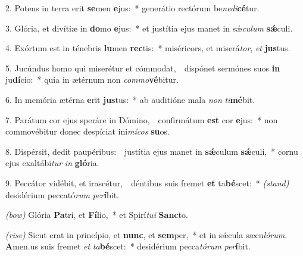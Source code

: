 2. Potens in terra erit \textbf{se}men \textbf{e}jus:~* generátio rectórum be\textit{ne}\textit{di}\textbf{cé}tur.

3. Glória, et divítiæ in \textbf{do}mo \textbf{e}jus:~* et justítia ejus manet in s\'{\ae}\textit{cu}\textit{lum} \textbf{s\'{\ae}}culi.

4. Exórtum est in ténebris \textbf{lu}men \textbf{rec}tis:~* miséricors, et miserá\textit{tor}, \textit{et} \textbf{jus}tus.

5. Jucúndus homo qui miserétur et cómmodat,~\GreDagger\ dispónet sermónes suos \textbf{in} ju\textbf{dí}cio:~* quia in ætérnum non \textit{com}\textit{mo}\textbf{vé}bitur.

6. In memória ætérna \textbf{e}rit \textbf{jus}tus:~* ab auditióne mala \textit{non} \textit{ti}\textbf{mé}bit.

7. Parátum cor ejus speráre in Dómino,~\GreDagger\ confirmátum \textbf{est} cor \textbf{e}jus:~* non commovébitur donec despíciat ini\textit{mí}\textit{cos} \textbf{su}os.

8. Dispérsit, dedit paupéribus:~\GreDagger\ justítia ejus manet in \textbf{s\'{\ae}}culum \textbf{s\'{\ae}}culi,~* cornu ejus exaltábi\textit{tur} \textit{in} \textbf{gló}ria.

9. Peccátor vidébit, et irascétur,~\GreDagger\ déntibus suis fremet \textbf{et} ta\textbf{bé}scet:~* {\color{red}\textit{(stand)}} desidérium peccató\textit{rum} \textit{per}\textbf{í}bit.

{\color{red}\textit{(bow)}} Glória \textbf{Pa}tri, et \textbf{Fí}lio,~* et Spirí\textit{tu}\textit{i} \textbf{Sanc}to.

{\color{red}\textit{(rise)}} Sicut erat in princípio, et \textbf{nunc}, et \textbf{sem}per,~* et in s\'{\ae}cula sæcu\textit{ló}\textit{rum}. \textbf{A}men.us suis fremet \textit{et} \textit{ta}\textbf{bé}scet:~* desidérium pecca\textit{tó}\textit{rum} \textit{per}\textbf{í}bit.